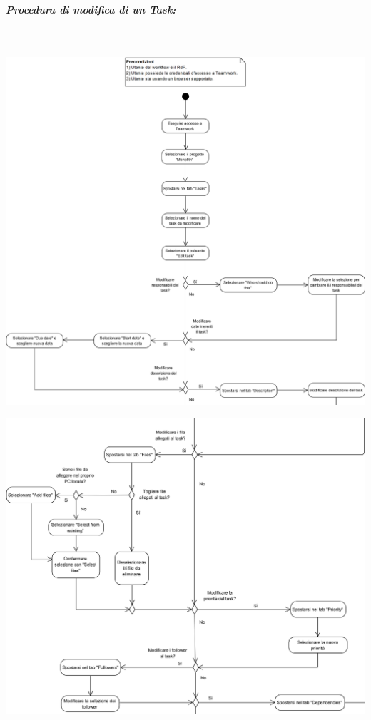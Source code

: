 \begin{samepage}
	\subparagraph{Procedura di modifica di un Task:}\mbox{}\\
	
	\begin{center}
		\includegraphics[width=15cm]{../../documenti/NormeDiProgetto/DiagrammiProcedure/EditTask1.png}
	\end{center}
	
\end{samepage}

\begin{center}
	\includegraphics[width=15cm]{../../documenti/NormeDiProgetto/DiagrammiProcedure/EditTask2.png}
\end{center}

